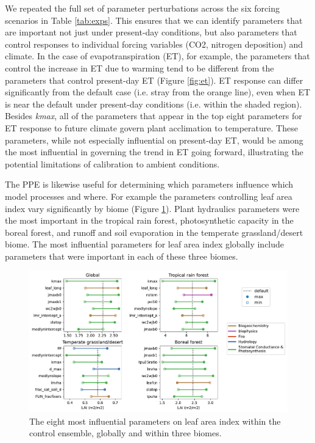 \documentclass[draft]{agujournal2019}
\begin{document}
We repeated the full set of parameter perturbations across the six forcing scenarios in Table \ref{tab:exps}. This ensures that we can identify parameters that are important not just under present-day conditions, but also parameters that control responses to individual forcing variables (CO2, nitrogen deposition) and climate.  In the case of evapotranspiration (ET), for example, the parameters that control the increase in ET due to warming tend to be different from the parameters that control present-day ET (Figure \ref{fig:et}). 
ET response can differ significantly from the default case (i.e. stray from the orange line), even when ET is near the default under present-day conditions (i.e. within the shaded region).
Besides \textit{kmax}, all of the parameters that appear in the top eight parameters for ET response to future climate govern plant acclimation to temperature. 
These parameters, while not especially influential on present-day ET, would be among the most influential in governing the trend in ET going forward, illustrating the potential limitations of calibration to ambient conditions.



The PPE is likewise useful for determining which parameters influence which model processes and where. For example the parameters controlling leaf area index vary significantly by biome (Figure \ref{fig:lai}). Plant hydraulics parameters were the most important in the tropical rain forest, photosynthetic capacity in the boreal forest, and runoff and soil evaporation in the temperate grassland/desert biome. The most influential parameters for leaf area index globally include parameters that were important in each of these three biomes. 

\begin{figure}[h]
\centering
\includegraphics[width=\textwidth]{../figs/lai_biome.pdf}
\caption{The eight most influential parameters on leaf area index within the control ensemble, globally and within three biomes.}
\label{fig:lai}
\end{figure}
\end{document}
